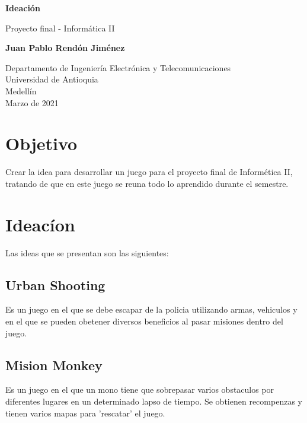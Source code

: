 \documentclass{article}
\begin{document}
\begin{titlepage}
    \begin{center}
        \vspace*{1cm}
            
        \Huge
        \textbf{Ideación}
            
        \vspace{0.5cm}
        \LARGE
       Proyecto final - Informática II
            
        \vspace{1.5cm}
            
        \textbf{Juan Pablo Rendón Jiménez}
            
        \vfill
            
        \vspace{0.8cm}
            
        \Large
        Departamento de Ingeniería Electrónica y Telecomunicaciones\\
        Universidad de Antioquia\\
        Medellín\\
        Marzo de 2021
            
    \end{center}
\end{titlepage}

\tableofcontents
\newpage
\section{Objetivo}\label{intro}
Crear la idea para desarrollar un juego para el proyecto final de Informética II, tratando de que en este juego se reuna todo lo aprendido durante el semestre.

\section{Ideacíon} \label{contenido}
Las ideas que se presentan son las siguientes:
\subsection{Urban Shooting}
Es un juego en el que se debe escapar de la policia utilizando armas, vehiculos y en el que se pueden obetener diversos beneficios al pasar misiones dentro del juego.


\subsection{Mision Monkey}
%
Es un juego en el que un mono tiene que sobrepasar varios obstaculos por diferentes lugares en un determinado lapso de tiempo.  Se obtienen recompenzas y tienen varios mapas para 'rescatar' el juego.
\end{document}
